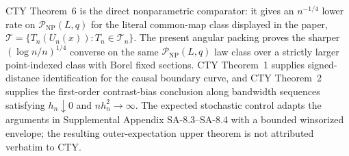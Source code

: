 CTY Theorem~6 is the direct nonparametric comparator: it gives an \(n^{-1/4}\) lower rate on \(\mathcal P_{\mathrm{NP}}(L,q)\) for the literal common-map class displayed in the paper, \(\mathcal T=\{T_n(U_n(x)):T_n\in\mathcal T_n\}\).  The present angular packing proves the sharper \((\log n/n)^{1/4}\) converse on the same \(\mathcal P_{\mathrm{NP}}(L,q)\) law class over a strictly larger point-indexed class with Borel fixed sections.  CTY Theorem~1 supplies signed-distance identification for the causal boundary curve, and CTY Theorem~2 supplies the first-order contrast-bias conclusion along bandwidth sequences satisfying \(h_n\downarrow0\) and \(nh_n^2\to\infty\).  The expected stochastic control adapts the arguments in Supplemental Appendix SA-8.3--SA-8.4 with a bounded winsorized envelope; the resulting outer-expectation upper theorem is not attributed verbatim to CTY.